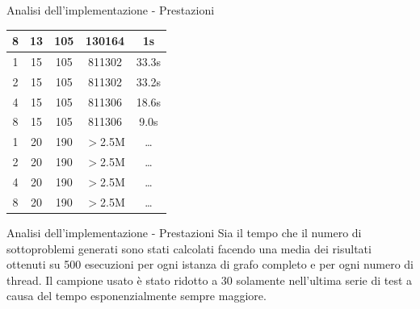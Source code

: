 \documentclass[10pt]{beamer}
\begin{document}
\begin{frame}{Analisi dell'implementazione - Prestazioni}
\begin{center}
{\begin{center}
\begin{tabular}{||c c c c c||}
                        \hline
                        8      & 13       & 105      & 130164           & 1s                       \\
                        \hline
                        \hline
                        1      & 15       & 105      & 811302           & 33.3s                    \\
                        \hline
                        2      & 15       & 105      & 811302           & 33.2s                    \\
                        \hline
                        4      & 15       & 105      & 811306           & 18.6s                    \\
                        \hline
                        8      & 15       & 105      & 811306           & 9.0s                     \\
                        \hline
                        \hline
                        1      & 20       & 190      & $>$2.5M          & \ldots                      \\
                        \hline
                        2      & 20       & 190      & $>$2.5M          & \ldots                      \\
                        \hline
                        4      & 20       & 190      & $>$2.5M          & \ldots                      \\
                        \hline
                        8      & 20       & 190      & $>$2.5M          & \ldots                      \\
                        \hline
                    \end{tabular}
                \end{center}
            }
        \end{center}


    \end{frame}

    \begin{frame}{Analisi dell'implementazione - Prestazioni}
        Sia il tempo che il numero di sottoproblemi generati sono stati calcolati facendo una media dei risultati ottenuti su 500 esecuzioni per ogni istanza di grafo completo e per ogni numero di thread.
        Il campione usato è stato ridotto a 30 solamente nell'ultima serie di test a causa del tempo esponenzialmente sempre maggiore.
    \end{frame}
\end{document}
